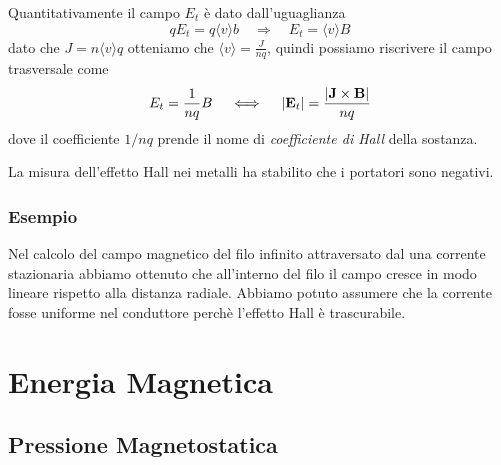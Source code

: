  Quantitativamente il campo $E_t$ \`e dato dall'uguaglianza 
 \begin{equation*}
 	q E_t = q  \langle v \rangle b \quad \Rightarrow \quad  E_t = \langle v \rangle B
 \end{equation*}
 dato che $J = n \langle v \rangle q$ otteniamo che $\langle v \rangle = \frac{J}{nq}$, quindi possiamo riscrivere il campo trasversale come 
 \begin{equation*}
 	E_t = \frac{1}{nq}B \quad \iff \quad |\bold{E}_{t}| = \frac{|\bold{J} \times \bold{B}|}{nq}
 \end{equation*}
dove il coefficiente $1/nq$ prende il nome di \textit{coefficiente di Hall} della sostanza.

La misura dell'effetto Hall nei metalli ha stabilito che i portatori sono negativi.
\subsubsection{Esempio}

Nel calcolo del campo magnetico del filo infinito attraversato dal una corrente stazionaria abbiamo ottenuto che all'interno del filo il campo cresce in modo lineare rispetto alla distanza radiale. Abbiamo potuto assumere che la corrente fosse uniforme nel conduttore perch\`e l'effetto Hall \`e trascurabile.

\section{Energia Magnetica}

\subsection{Pressione Magnetostatica}


